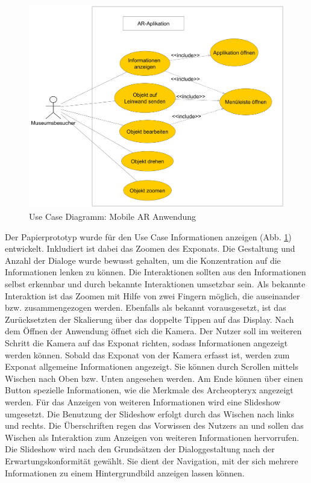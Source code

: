 \documentclass[runningheads,a4paper, 12pt]{llncs}
\begin{document}
\begin{figure}[H]
	\centering
	\includegraphics[scale=0.12]{use_c_museum}
	\caption{Use Case Diagramm: Mobile AR Anwendung}
	\label{pict:use_case}
\end{figure} 

Der Papierprototyp wurde für den Use Case \glqq Informationen anzeigen \grqq{} (Abb. \ref{pict:use_case}) entwickelt. Inkludiert ist dabei das Zoomen des Exponats. Die Gestaltung und Anzahl der Dialoge wurde bewusst gehalten, um die Konzentration auf die Informationen lenken zu können. Die Interaktionen sollten aus den Informationen selbst erkennbar und durch bekannte Interaktionen umsetzbar sein. Als bekannte Interaktion ist das Zoomen mit Hilfe von zwei Fingern möglich, die auseinander bzw. zusammengezogen werden. Ebenfalls als bekannt vorausgesetzt, ist das Zurücksetzten der Skalierung über das doppelte Tippen auf das Display. Nach dem Öffnen der Anwendung öffnet sich die Kamera. Der Nutzer soll im weiteren Schritt die Kamera auf das Exponat richten, sodass Informationen angezeigt werden können. Sobald das Exponat von der Kamera erfasst ist, werden zum Exponat allgemeine Informationen angezeigt. Sie können durch Scrollen mittels Wischen nach Oben bzw. Unten angesehen werden. Am Ende können über einen Button spezielle Informationen, wie die Merkmale des Archeopteryx angezeigt werden. Für das Anzeigen von weiteren Informationen wird eine Slideshow umgesetzt. Die Benutzung der Slideshow erfolgt durch das Wischen nach links und rechts. Die Überschriften regen das Vorwissen des Nutzers an und sollen das Wischen als Interaktion zum Anzeigen von weiteren Informationen hervorrufen. Die Slideshow wird nach den Grundsätzen der Dialoggestaltung nach der Erwartungskonformität gewählt. Sie dient der Navigation, mit der sich mehrere Informationen zu einem Hintergrundbild anzeigen lassen können.\\
\end{document}

